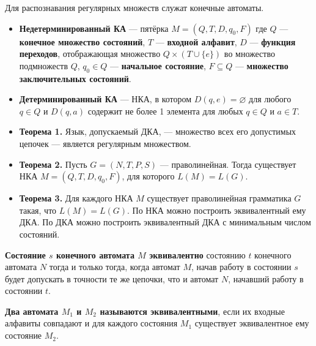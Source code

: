 Для распознавания регулярных множеств служат конечные автоматы.
\begin{itemize}
    \item \textbf{Недетерминированный КА} --- пятёрка $M = (Q, T, D, q_0, F)$ где $Q$ --- \textbf{конечное множество состояний}, $T$ --- \textbf{входной алфавит}, $D$ --- \textbf{функция переходов}, отображающая множество $Q \times (T \cup \{e\})$ во множество подмножеств $Q$, $q_0 \in Q$ --- \textbf{начальное состояние}, $F \subseteq Q$ --- \textbf{множество заключительных состояний}.
    \item \textbf{Детерминированный КА} --- НКА, в котором $D(q, e) = \varnothing$ для любого $q \in Q$ и $D(q, a)$ содержит не более 1 элемента для любых $q \in Q$ и $a \in T$.
    \item \textbf{Теорема 1.} 
    Язык, допускаемый ДКА, --- множество всех его допустимых цепочек --- является регулярным множеством.
    \item \textbf{Теорема 2.} 
    Пусть $G = (N, T, P, S)$ --- праволинейная. 
    Тогда существует НКА $M = (Q, T, D, q_0, F)$, для которого $L(M) = L(G)$.
    \item \textbf{Теорема 3.} 
    Для каждого НКА $M$ существует праволинейная грамматика $G$ такая, что $L(M) = L(G)$. 
    По НКА можно построить эквивалентный ему ДКА. 
    По ДКА можно построить эквивалентный ДКА с минимальным числом состояний.
\end{itemize}


\textbf{Состояние $s$ конечного автомата $M$ эквивалентно} состоянию $t$ конечного автомата $N$ тогда и только тогда, когда автомат $M$, начав работу в состоянии $s$ будет допускать в точности те же цепочки, что и автомат $N$, начавший работу в состоянии $t$.

\textbf{Два автомата $M_1$ и $M_2$ называются эквивалентными}, если их входные алфавиты совпадают и для каждого состояния $M_1$ существует эквивалентное ему состояние $M_2$.


